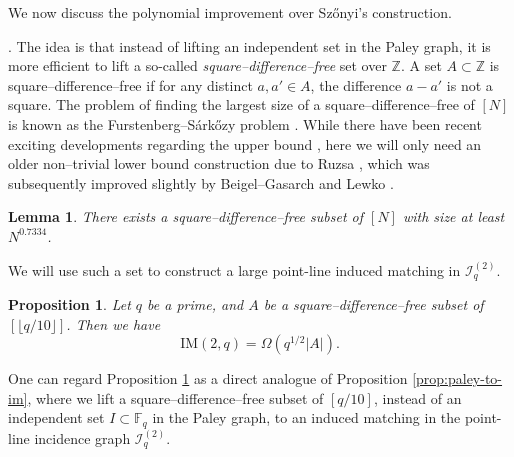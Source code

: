 \documentclass[12pt,reqno]{amsart}
\theoremstyle{plain}
\newtheorem{lemma}[theorem]{Lemma}
\newtheorem{proposition}[theorem]{Proposition}
\theoremstyle{definition}
\newcommand{\F}{\mathbb{F}}
\newcommand{\Z}{\mathbb{Z}}
\newcommand{\IM}{\mathrm{IM}}
\newcommand{\II}{\mathcal{I}}
\newcommand{\1}{\mathbf{1}}
\begin{document}
We now discuss the polynomial improvement over Sz\H{o}nyi's construction. 

\medskip
{}. The idea is that instead of lifting an independent set in the Paley graph, it is more efficient to lift a so-called {\it{square--difference--free}} set over $\Z$. A set $A \subset \Z$ is square--difference--free if for any distinct $a, a'\in A$, the difference $a - a'$ is not a square. The problem of finding the largest size of a square--difference--free of $[N]$ is known as the Furstenberg--S\'{a}rk\H{o}zy problem \cite{Furstenberg, Sarkozy}. While there have been recent exciting developments regarding the upper bound \cite{GreenSawhney}, here we will only need an older non--trivial lower bound construction due to Ruzsa \cite{Ruzsa}, which was subsequently improved slightly by Beigel--Gasarch and Lewko \cite{BeigelGasarch, Lewko}.
\begin{lemma}
    \label{thm:Ruzsa-square}
    There exists a square--difference--free subset of $[N]$ with size at least $N^{0.7334}$.
\end{lemma}
We will use such a set to construct a large point-line induced matching in $\II_q^{(2)}$.
\begin{proposition}
\label{lem:Ruzsa-lift}
Let $q$ be a prime, and $A$ be a square--difference--free subset of $[\lfloor q / 10\rfloor]$. Then we have
$$\IM(2,q) = \Omega(q^{1/2} |A|).$$
\end{proposition}
One can regard Proposition \ref{lem:Ruzsa-lift} as a direct analogue of Proposition \ref{prop:paley-to-im}, where we lift a square--difference--free subset of $[q/10]$, instead of an independent set $I \subset \F_q$ in the Paley graph, to an induced matching in the point-line incidence graph $\II_q^{(2)}$. 
\end{document}
